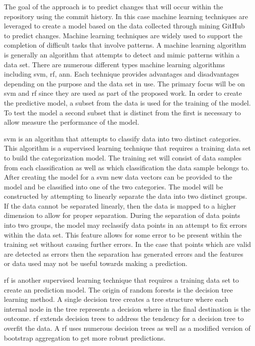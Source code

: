 The goal of the approach is to predict changes that will occur within the repository using the commit history. In this case machine learning techniques are leveraged to create a model based on the data collected through mining GitHub to predict changes. Machine learning techniques are widely used to support the completion of difficult tasks that involve patterns. A machine learning algorithm is generally an algorithm that attempts to detect and mimic patterns within a data set. There are numerous different types machine learning algorithms including \gls{svm}, \gls{rf}, \gls{ann}. Each technique provides advantages and disadvantages depending on the purpose and the data set in use. The primary focus will be on \gls{svm} and \gls{rf} since they are used as part of the proposed work. In order to create the predictive model, a subset from the data is used for the training of the model. To test the model a second subset that is distinct from the first is necessary to allow measure the performance of the model.

\gls{svm} is an algorithm that attempts to classify data into two distinct categories. This algorithm is a supervised learning technique that requires a training data set to build the categorization model. The training set will consist of data samples from each classification as well as which classification the data sample belongs to. After creating the model for a \gls{svm} new data vectors can be provided to the model and be classified into one of the two categories. The model will be constructed by attempting to linearly separate the data into two distinct groups. If the data cannot be separated linearly, then the data is mapped to a higher dimension to allow for proper separation. During the separation of data points into two groups, the model may reclassify data points in an attempt to fix errors within the data set. This feature allows for some error to be present within the training set without causing further errors. In the case that points which are valid are detected as errors then the separation has generated errors and the features or data used may not be useful towards making a prediction.%

\gls{rf} is another supervised learning technique that requires a training data set to create an prediction model. The origin of random forests is the decision tree learning method. A single decision tree creates a tree structure where each internal node in the tree represents a decision where in the final destination is the outcome. \gls{rf} extends decision trees to address the tendency for a decision tree to overfit the data. A \gls{rf} uses numerous decision trees as well as a modified version of bootstrap aggregation to get more robust predictions.

